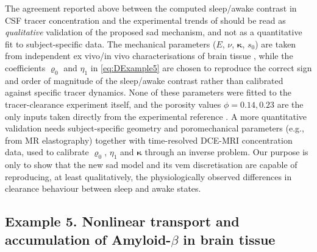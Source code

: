 \documentclass[fleqn,a4paper]{cas-sc}
\newcommand{\bkappa}{\boldsymbol{\kappa}}
\newcommand{\0}{\boldsymbol{0}}
\numberwithin{equation}{section}
\numberwithin{figure}{section}
\begin{document}
{The agreement reported above between the computed sleep/awake contrast in CSF tracer concentration and the experimental trends of \cite{evpmr2021,Xie2013-me} should be read as \emph{qualitative} validation of the proposed \gls{sad} mechanism, and not as a quantitative fit to subject-specific data. The mechanical parameters ($E$, $\nu$, $\bkappa$, $s_0$) are taken from independent ex vivo/in vivo characterisations of brain tissue \cite{Budday2015-jx,vemrs2020,cadq2023}, while the coefficients $\varrho_0$ and $\eta_1$ in \eqref{eq:DExample5} are chosen to reproduce the correct sign and order of magnitude of the sleep/awake contrast rather than calibrated against  specific tracer dynamics. None of these parameters were fitted to the tracer-clearance experiment itself, and the porosity values $\phi=0.14,0.23$ are the only inputs taken directly from the experimental reference \cite{Xie2013-me}. A more quantitative validation needs subject-specific geometry and poromechanical parameters (e.g., from MR elastography) together with time-resolved DCE-MRI concentration data, used to calibrate $\varrho_0$, $\eta_1$ and $\bkappa$ through an inverse problem. Our purpose is only to show that the new \gls{sad} model and its \gls{vem} discretisation are capable of reproducing, at least qualitatively, the physiologically observed differences in clearance behaviour between sleep and awake states.}

\subsection{Example 5. Nonlinear transport and accumulation of Amyloid-$\beta$ in brain tissue}\label{sec:brainExample2}
\end{document}
